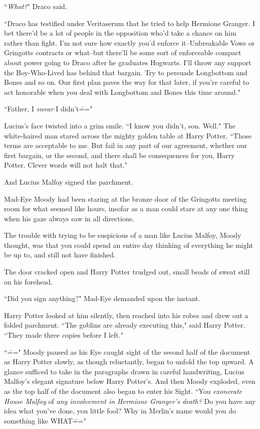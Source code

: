 ``\emph{What?}" Draco said.

``Draco has testified under Veritaserum that he tried to help Hermione Granger. I bet there'd be a lot of people in the opposition who'd take a chance on him rather than fight. I'm not sure how exactly you'd enforce it\---Unbreakable Vows or Gringotts contracts or what\---but there'll be some sort of enforceable compact about power going to Draco after he graduates Hogwarts. I'll throw any support the Boy-Who-Lived has behind that bargain. Try to persuade Longbottom and Bones and so on. Our first plan paves the way for that later, if you're careful to act honorable when you deal with Longbottom and Bones this time around."

``Father, I \emph{swear} I didn't\==="

Lucius's face twisted into a grim smile. ``I know you didn't, son. Well." The white-haired man stared across the mighty golden table at Harry Potter. ``Those terms are acceptable to me. But fail in any part of our agreement, whether our first bargain, or the second, and there shall be consequences for you, Harry Potter. Clever words will not halt that."

And Lucius Malfoy signed the parchment.

\later

Mad-Eye Moody had been staring at the bronze door of the Gringotts meeting room for what seemed like hours, insofar as a man could stare at any one thing when his gaze always saw in all directions.

The trouble with trying to be suspicious of a man like Lucius Malfoy, Moody thought, was that you could spend an entire day thinking of everything he might be up to, and still not have finished.

The door cracked open and Harry Potter trudged out, small beads of sweat still on his forehead.

``Did you sign anything?" Mad-Eye demanded upon the instant.

Harry Potter looked at him silently, then reached into his robes and drew out a folded parchment. ``The goblins are already executing this," said Harry Potter. ``They made three copies before I left."

``\===" Moody paused as his Eye caught sight of the second half of the document as Harry Potter slowly, as though reluctantly, began to unfold the top upward. A glance sufficed to take in the paragraphs drawn in careful handwriting, Lucius Malfoy's elegant signature below Harry Potter's. And then Moody exploded, even as the top half of the document also began to enter his Sight. ``You \emph{exonerate House Malfoy} of \emph{any involvement in Hermione Granger's death?} Do you have any idea what you've done, you little fool? Why in Merlin's name would you do something like WHAT\==="

